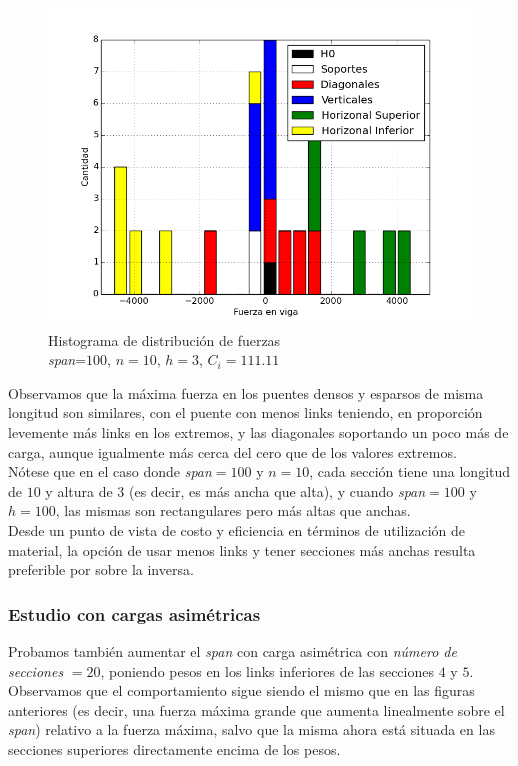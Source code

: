 \begin{figure}[h!]
\begin{center}
\includegraphics[scale=0.5]{archivos/graficos/hist_n10_C1000.png}
\caption{\label{fig:hist_n10_C1000}Histograma de distribución de fuerzas\\
\textit{span}=$100$, $n=10$, $h=3$, $C_i=111.11$}
\end{center}
\end{figure}

Observamos que la máxima fuerza en los puentes densos y esparsos de misma longitud son similares, con el puente con menos links teniendo, en proporción levemente más links en los extremos, y las diagonales soportando un poco más de carga, aunque igualmente más cerca del cero que de los valores extremos.\\

Nótese que en el caso donde \textit{span}$=100$ y $n=10$, cada sección tiene una longitud de $10$ y altura de $3$ (es decir, es más ancha que alta), y cuando \textit{span}$=100$ y $h=100$, las mismas son rectangulares pero más altas que anchas.\\

Desde un punto de vista de costo y eficiencia en términos de utilización de material, la opción de usar menos links y tener secciones más anchas resulta preferible por sobre la inversa.\\

\subsubsection{Estudio con cargas asimétricas}
Probamos también aumentar el \textit{span} con carga asimétrica con \textit{número de secciones} $=20$, poniendo pesos en los links inferiores de las secciones $4$ y $5$. Observamos que el comportamiento sigue siendo el mismo que en las figuras anteriores (es decir, una fuerza máxima grande que aumenta linealmente sobre el \textit{span}) relativo a la fuerza máxima, salvo que la misma ahora está situada en las secciones superiores directamente encima de los pesos.\\

